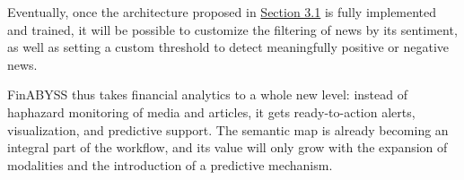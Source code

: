 Eventually, once the architecture proposed in \hyperref[sec:architecture]{Section 3.1} is fully implemented and trained, it will be possible
to customize the filtering of news by its sentiment, as well as setting a custom threshold to detect meaningfully
positive or negative news.

FinABYSS thus takes financial analytics to a whole new level: instead of haphazard monitoring of media and articles,
it gets ready-to-action alerts, visualization, and predictive support. The semantic map is already becoming an integral
part of the workflow, and its value will only grow with the expansion of modalities and the introduction of a predictive
mechanism.